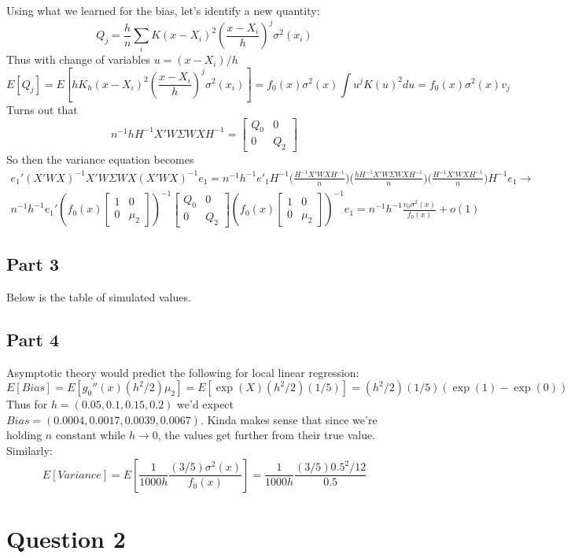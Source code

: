 \documentclass{article}
\begin{document}
Using what we learned for the bias, let's identify a new quantity:
\[
Q_j = \frac{h}{n} \sum_i K(x - X_i)^2 (\frac{x - X_i}{h})^j \sigma^2(x_i)
\]
Thus with change of variables $u = (x - X_i)/h$
\[
E[Q_j] = E[h K_h(x - X_i)^2  (\frac{x - X_i}{h})^j \sigma^2(x_i) ] = f_0(x) \sigma^2(x) \int u^j K(u)^2 du = f_0(x) \sigma^2(x) v_j
\]
Turns out that
\[
n^{-1} h H^{-1} X' W \Sigma W X H^{-1} = \begin{bmatrix} Q_0 & 0 \\ 0 & Q_2 \end{bmatrix}
\]
So then the variance equation becomes
\begin{align*}
e_1'(X'WX)^{-1}X'W \Sigma W X (X'WX)^{-1} e_1 = n^{-1}h^{-1}e'_1 H^{-1} \Big(\frac{H^{-1} X' W X H^{-1}}{n}\Big) \Big(\frac{h H^{-1} X'W \Sigma W X H^{-1}}{n} \Big) \Big(\frac{H^{-1} X' W X H^{-1}}{n}\Big)H^{-1} e_1 \rightarrow \\
n^{-1} h^{-1}e_1'(f_0(x) \begin{bmatrix} 1 & 0 \\ 0 & \mu_2 \end{bmatrix})^{-1} \begin{bmatrix} Q_0 & 0 \\ 0 & Q_2 \end{bmatrix}(f_0(x) \begin{bmatrix} 1 & 0 \\ 0 & \mu_2 \end{bmatrix})^{-1}e_1 = n^{-1}h^{-1} \frac{v_0 \sigma^2(x)}{f_0(x)} + o(1)
\end{align*}
\subsection{Part 3}
Below is the table of simulated values. 

\subsection{Part 4}
Asymptotic theory would predict the following for local linear regression:
\[
E[Bias] = E[g_0''(x)(h^2/2)\mu_2] = E[\exp(X)(h^2/2) (1/5)] = (h^2/2) (1/5)(\exp(1) - \exp(0))
\]
Thus for $h = (0.05,0.1,0.15,0.2)$ we'd expect $Bias = (0.0004,0.0017,0.0039,0.0067)$. Kinda makes sense that since we're holding $n$ constant while $h \rightarrow 0$, the values get further from their true value. Similarly:
\[
E[Variance] =E[ \frac{1}{1000h}\frac{(3/5) \sigma^2(x)}{ f_0(x)}] = \frac{1}{1000h}\frac{(3/5) 0.5^2/12}{0.5}
\]
 
\section{Question 2}
\end{document}
